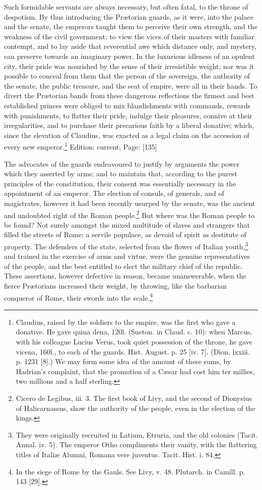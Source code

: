 Such formidable servants are always necessary, but often fatal, to the throne of despotism. By thus introducing the Prætorian guards, as it were, into the palace and the senate, the emperors taught them to perceive their own strength, and the weakness of the civil government; to view the vices of their masters with familiar contempt, and to lay aside that reverential awe which distance only, and mystery, can preserve towards an imaginary power. In the luxurious idleness of an opulent city, their pride was nourished by the sense of their irresistible weight; nor was it possible to conceal from them that the person of the sovereign, the authority of the senate, the public treasure, and the seat of empire, were all in their hands. To divert the Prætorian bands from these dangerous reflections the firmest and best established princes were obliged to mix blandishments with commands, rewards with punishments, to flatter their pride, indulge their pleasures, connive at their irregularities, and to purchase their precarious faith by a liberal donative; which, since the elevation of Claudius, was exacted as a legal claim on the accession of every new emperor.\footnote{Claudius, raised by the soldiers to the empire, was the first who gave a donative. He gave quina dena, 120l. (Sueton. in Claud. c. 10): when Marcus, with his colleague Lucius Verus, took quiet possession of the throne, he gave vicena, 160l., to each of the guards. Hist. August. p. 25 [iv. 7]. (Dion, lxxiii. p. 1231 [8].) We may form some idea of the amount of these sums, by Hadrian\texthebrew{}’s complaint, that the promotion of a Cæsar had cost him ter millies, two millions and a half sterling.}
Edition: current; Page: [135]

The advocates of the guards endeavoured to justify by arguments the power which they asserted by arms; and to maintain that, according to the purest principles of the constitution, their consent was essentially necessary in the appointment of an emperor. The election of consuls, of generals, and of magistrates, however it had been recently usurped by the senate, was the ancient and undoubted right of the Roman people.\footnote{Cicero de Legibus, iii. 3. The first book of Livy, and the second of Dionysius of Halicarnassus, show the authority of the people, even in the election of the kings.} But where was the Roman people to be found? Not surely amongst the mixed multitude of slaves and strangers that filled the streets of Rome; a servile populace, as devoid of spirit as destitute of property. The defenders of the state, selected from the flower of Italian youth,\footnote{They were originally recruited in Latium, Etruria, and the old colonies (Tacit. Annal. iv. 5). The emperor Otho compliments their vanity, with the flattering titles of Italiæ Alumni, Romana vere juventus. Tacit. Hist. i. 84.} and trained in the exercise of arms and virtue, were the genuine representatives of the people, and the best entitled to elect the military chief of the republic. These assertions, however defective in reason, became unanswerable, when the fierce Prætorians increased their weight, by throwing, like the barbarian conqueror of Rome, their swords into the scale.\footnote{In the siege of Rome by the Gauls. See Livy, v. 48. Plutarch. in Camill. p. 143 [29].}

